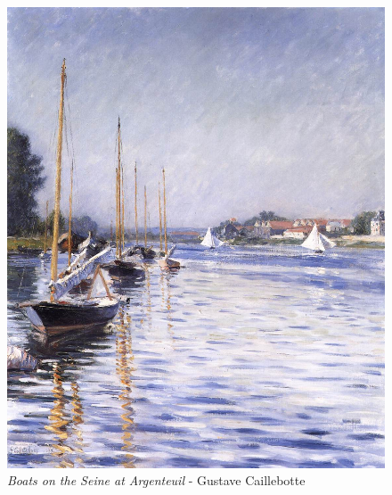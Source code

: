 \documentclass[a4paper]{article}
\begin{document}
\begin {figure}[h!]
\centering
\begin{minipage}[b]{.49\textwidth}
	\centering
	\includegraphics[width=\textwidth]{SeaPaintings/_Stl__caillebotteboatsontheseineatargenteuil.jpg}
    \caption{\emph{Boats on the Seine at Argenteuil} - Gustave Caillebotte}
\end{minipage}
\hfill
\begin{minipage}[b]{.49\textwidth}
	\centering

\end{minipage}
\end{figure}
\end{document}
